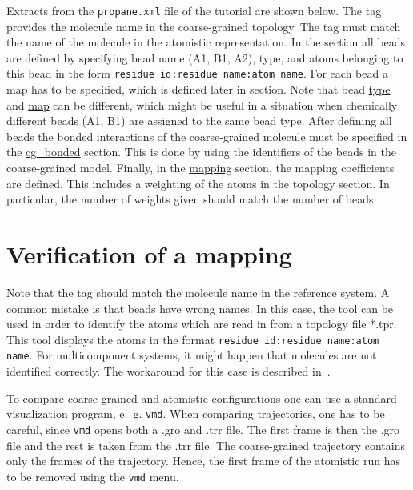 Extracts from the \texttt{propane.xml} file of the tutorial are shown below. The  tag provides the molecule name in the coarse-grained topology. The  tag must match the name of the molecule in the atomistic representation. In the  section all beads are defined by specifying bead name (A1, B1, A2), type, and atoms belonging to this bead in the form \texttt{residue id:residue name:atom name}. For each bead a map has to be specified, which is defined later in  section. Note that bead \hyperlink{\mapref{topology.cg_beads.cg_bead.type}}{type} and \hyperlink{\mapref{maps.map}}{map} can be different, which might be useful in a situation when chemically different beads (A1, B1) are assigned to the same bead type. After defining all beads the bonded interactions of the coarse-grained molecule must be specified in the \hyperlink{\mapref{topology.cg_bonded}}{cg\_bonded} section. This is done by using the identifiers of the beads in the coarse-grained model. Finally, in the \hyperlink{\mapref{topology.cg_beads.cg_bead.mapping}}{mapping} section, the mapping coefficients are defined. This includes a weighting of the atoms in the topology section. In particular, the number of weights given should match the number of beads.

\section{Verification of a mapping}
\label{sec:mapping_verification}
Note that the  tag should match the molecule name in the reference system. A common mistake is that beads have wrong names. In this case, the  tool can be used in order to identify the atoms which are read in from a topology file *.tpr. This tool displays the atoms in the format \texttt{residue id:residue name:atom name}. For multicomponent systems, it might happen that molecules are not identified correctly. The workaround for this case is described in~.

To compare coarse-grained and atomistic configurations one can use a standard visualization program, e.~g. \texttt{vmd}.  When comparing trajectories, one has to be careful, since \texttt{vmd} opens both a .gro and .trr file. The first frame is then the .gro file and the rest is taken from the .trr file. The coarse-grained trajectory contains only the frames of the  trajectory. Hence, the first frame of the atomistic run has to be removed using the \texttt{vmd} menu.


